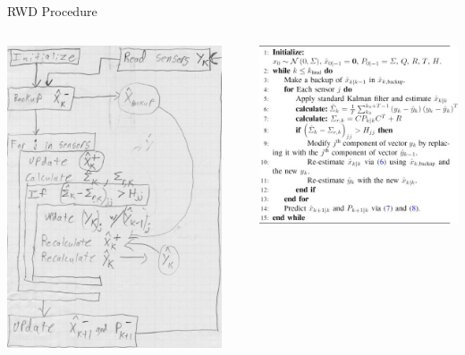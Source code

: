 \documentclass[aspectratio=169]{beamer}
\begin{document}
\begin{frame}{RWD Procedure}
	\begin{columns}
		\begin{column}{0.33\textwidth}
			\includegraphics[width=\columnwidth]{Images/RWD_Diagram}
		\end{column}
		\begin{column}{0.05\textwidth}\end{column}
		\begin{column}{0.5\textwidth}
			\includegraphics[width=\columnwidth]{Images/RWD_Procedure}

\end{column}
\end{columns}
\end{frame}
\end{document}
